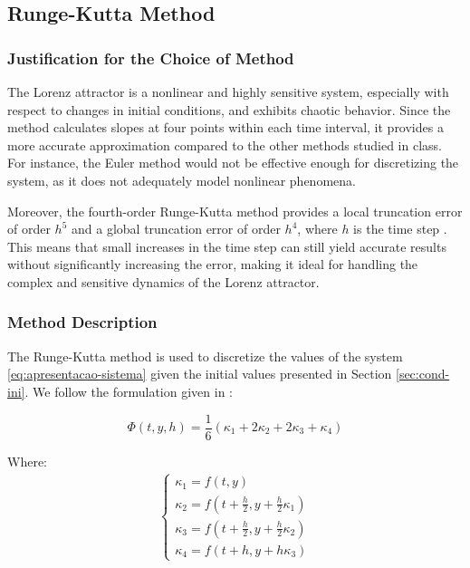 \documentclass[12pt, a4paper]{article}
\begin{document}
	\subsection{Runge-Kutta Method}
	\subsubsection{Justification for the Choice of Method}
	
	The Lorenz attractor is a nonlinear and highly sensitive system, especially with respect to changes in initial conditions, and exhibits chaotic behavior. Since the method calculates slopes at four points within each time interval, it provides a more accurate approximation compared to the other methods studied in class. For instance, the Euler method would not be effective enough for discretizing the system, as it does not adequately model nonlinear phenomena.
	
	Moreover, the fourth-order Runge-Kutta method provides a local truncation error of order $h^5$ and a global truncation error of order $h^4$, where $h$ is the time step \cite{burden2016} \cite{roma2023}. This means that small increases in the time step can still yield accurate results without significantly increasing the error, making it ideal for handling the complex and sensitive dynamics of the Lorenz attractor.
	
	\subsubsection{Method Description}
	
	The Runge-Kutta method is used to discretize the values of the system \eqref{eq:apresentacao-sistema} given the initial values presented in Section \ref{sec:cond-ini}. We follow the formulation given in \cite{roma2023}:
	
	\begin{equation}
		\Phi(t, y, h) = \frac{1}{6} (\kappa_1 + 2\kappa_2 + 2\kappa_3 + \kappa_4)
	\end{equation}
	
	Where:
	\begin{align}
		\begin{cases}                                                     
		\kappa_1 = f(t, y)                                                \\
		\kappa_2 = f\left(t + \frac{h}{2}, y + \frac{h}{2}\kappa_1\right) \\
		\kappa_3 = f\left(t + \frac{h}{2}, y + \frac{h}{2}\kappa_2\right) \\
		\kappa_4 = f(t + h, y + h\kappa_3)                                
		\end{cases}                                                       
	\end{align}
	
\end{document}
